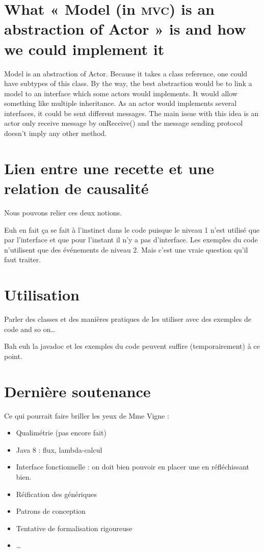 \documentclass[11pt]{article}
\begin{document}

\section{What « Model (in \textsc{mvc}) is an abstraction of Actor » is and how we could implement it}

Model is an abstraction of Actor. Because it takes a class reference, one could have subtypes of this class. By the way, the best abstraction would be to link a model to an interface which some actors would implements. It would allow something like multiple inheritance. As an actor would implements several interfaces, it could be sent different messages. The main issue with this idea is an actor only receive message by onReceive() and the message sending protocol doesn't imply any other method.


\section{Lien entre une recette et une relation de causalité}

Nous pouvons relier ces deux notions.

Euh en fait ça se fait à l'instinct dans le code puisque le niveau 1 n'est utilisé que par l'interface et que pour l'instant il n'y a pas d'interface. Les exemples du code n'utilisent que des événements de niveau 2. Mais c'est une vraie question qu'il faut traiter.

\section{Utilisation}

Parler des classes et des manières \og pratiques \fg{} de les utiliser avec des exemples de code and so on…

Bah euh la javadoc et les exemples du code peuvent suffire (temporairement) à ce point.

\section{Dernière soutenance}

Ce qui pourrait faire briller les yeux de Mme Vigne :
\begin{itemize}
\item Qualimétrie (pas encore fait)
\item Java 8 : flux, lambda-calcul
\item Interface fonctionnelle : on doit bien pouvoir en placer une en réfléchissant bien.
\item Réification des génériques
\item Patrons de conception
\item Tentative de formalisation rigoureuse
\item …
\end{itemize}
\end{document}
